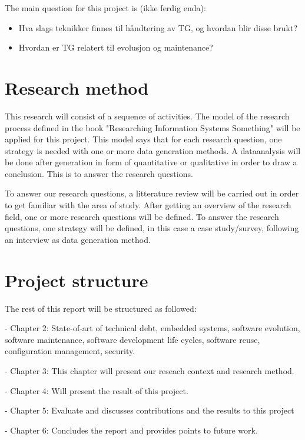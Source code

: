 The main question for this project is (ikke ferdig enda): 
\begin{itemize}
	\item Hva slags teknikker finnes til håndtering av TG, og hvordan blir disse brukt?
	\item Hvordan er TG relatert til evolusjon og maintenance?
\end{itemize}

\section{Research method}
This research will consist of a sequence of activities. The model of the research process defined in the book "Researching Information Systems Something" will be applied for this project. This model says that for each research question, one strategy is needed with one or more data generation methods. A dataanalysis will be done after generation in form of quantitative or qualitative in order to draw a conclusion. This is to answer the research questions.

To answer our research questions, a litterature review will be carried out in order to get familiar with the area of study. After getting an overview of the research field, one or more research questions will be defined. To answer the research questions, one strategy will be defined, in this case a case study/survey, following an interview as data generation method.

\section{Project structure}
The rest of this report will be structured as followed:

- Chapter 2: State-of-art of technical debt, embedded systems, software evolution, software maintenance, software development life cycles, software reuse, configuration management, security.

- Chapter 3: This chapter will present our reseach context and research method. 

- Chapter 4: Will present the result of this project.

- Chapter 5: Evaluate and discusses contributions and the results to this project

- Chapter 6: Concludes the report and provides points to future work. 
